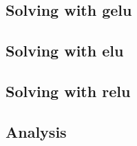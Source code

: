 \subsection{Solving with gelu}

\subsection{Solving with elu}

\subsection{Solving with relu}




\subsection{Analysis}
